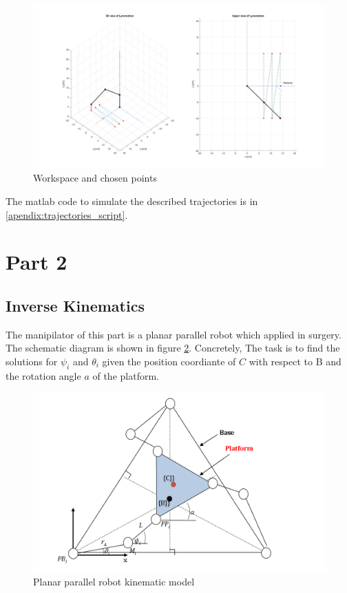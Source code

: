 \documentclass{article}
\begin{document}
\begin{figure}
\begin{center}
\includegraphics[width=\textwidth]{images/Trajectory_Cartesian}
\caption{Workspace and chosen points}
\label{fig:trajectories.cartesian}
\end{center}
\end{figure}

The matlab code to simulate the described trajectories is in \ref{apendix:trajectories_script}. 

\section{Part 2}
\subsection{Inverse Kinematics}
The manipilator of this part is a planar parallel robot which applied in surgery. The schematic diagram is shown in  figure \ref{fig:Parallel}. Concretely, The task is to find the solutions for $\psi_i$ and $\theta_i$ given the position coordiante of $C$ with respect to B and the rotation angle $a$ of the platform.
\begin{figure}[htbp] 
\begin{center}
\includegraphics[width=\textwidth]{images/Parallel}
\caption{Planar parallel robot kinematic model}
\label{fig:Parallel}
\end{center}
\end{figure}
\end{document}
